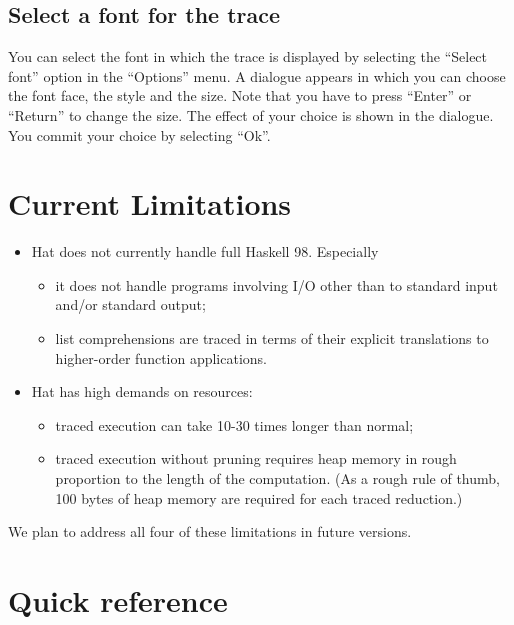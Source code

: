 \documentclass[12pt]{article}
\begin{document}
\subsection{Select a font for the trace}

You can select the font in which the trace is displayed by selecting the ``Select font'' option in the ``Options'' menu. A dialogue appears in which you can choose the font face, the style and the size. Note that you have to press ``Enter'' or ``Return'' to change the size. The effect of your choice is shown in the dialogue. You commit your choice by selecting ``Ok''.



\section{Current Limitations}

\begin{itemize}
\item
Hat does not currently handle full Haskell 98. Especially
\begin{itemize}
\item
it does not handle programs involving
I/O other than to standard input and/or standard output;
\item
list comprehensions are traced in terms of their explicit
translations to higher-order function applications.
\end{itemize}

\item
Hat has high demands on resources:
\begin{itemize}
\item
traced execution can take 10-30 times longer than normal;
\item
traced execution without pruning requires heap memory in
rough proportion to the length of the computation.
(As a rough rule of thumb, 100 bytes of heap memory are
required for each traced reduction.)
\end{itemize}

\end{itemize}

We plan to address all four of these limitations in future versions.



\section{Quick reference}
\end{document}
